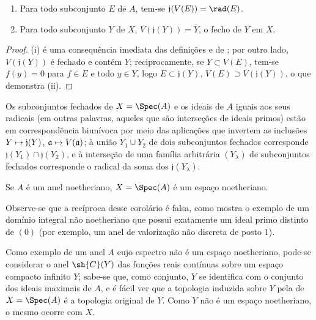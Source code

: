 \documentclass[oneside]{amsart}
\makeatletter
\newcommand{\ega@arrow}[2]{\mathchoice{#1}{#2}{#2}{#2}}
\let\ega@shortmapsto\mapsto
\renewcommand{\mapsto}{\ega@arrow{\longmapsto}{\ega@shortmapsto}}
\let\EGAOriginalLabel\label
\renewcommand{\label}[1]{\phantomsection\EGAOriginalLabel{#1}}
\makeatother
\begin{document}
\begin{proposition}[1.1.4]
\label{I.1.1.4}
\medskip\noindent
\begin{enumerate}
  \item[{\rm(i)}] Para todo subconjunto $E$ de $A$, tem-se $\mathfrak{j}(V(E))=\rad(E)$.
  \item[{\rm(ii)}] Para todo subconjunto $Y$ de $X$, $V(\mathfrak{j}(Y))=\overline{Y}$, o fecho de $Y$ em $X$.
\end{enumerate}
\end{proposition}

\begin{proof}
(i) é uma consequência imediata das definições e de ;
por outro lado, $V(\mathfrak{j}(Y))$ é fechado e contém $Y$;
reciprocamente, se $Y\subset V(E)$, tem-se $f(y)=0$ para $f\in E$ e todo $y\in Y$, logo $E\subset\mathfrak{j}(Y)$, $V(E)\supset V(\mathfrak{j}(Y))$, o que demonstra (ii).
\end{proof}

\begin{corollary}[1.1.5]
\label{I.1.1.5}
Os subconjuntos fechados de $X=\Spec(A)$ e os ideais de $A$ iguais aos seus radicais (em outras palavras, aqueles que são interseções de ideais primos) estão em correspondência biunívoca por meio das aplicações que invertem as inclusões $Y\mapsto\mathfrak{j}(Y)$, $\mathfrak{a}\mapsto V(\mathfrak{a})$;
à união $Y_1\cup Y_2$ de dois subconjuntos fechados corresponde $\mathfrak{j}(Y_1)\cap\mathfrak{j}(Y_2)$, e à interseção de uma família arbitrária $(Y_\lambda)$ de subconjuntos fechados corresponde o radical da soma dos $\mathfrak{j}(Y_\lambda)$.
\end{corollary}

\begin{corollary}[1.1.6]
\label{I.1.1.6}
Se $A$ é um anel noetheriano, $X=\Spec(A)$ é um espaço noetheriano.
\end{corollary}

Observe-se que a recíproca desse corolário é falsa, como mostra o exemplo de um domínio integral não noetheriano que possui exatamente um ideal primo distinto de $(0)$ (por exemplo, um anel de valorização não discreta de posto $1$).

Como exemplo de um anel $A$ cujo espectro não é um espaço noetheriano, pode-se considerar o anel $\sh{C}(Y)$ das funções reais contínuas sobre um espaço compacto infinito $Y$;
sabe-se que, como conjunto, $Y$ se identifica com o conjunto dos ideais maximais de $A$, e é fácil ver que a topologia induzida sobre $Y$ pela de $X=\Spec(A)$ é a topologia original de $Y$.
Como $Y$ não é um espaço noetheriano, o mesmo ocorre com $X$.
\end{document}
